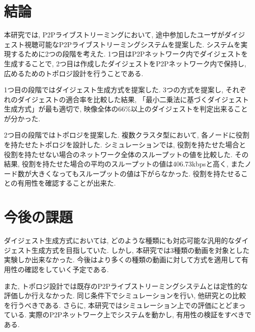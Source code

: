 \section{結論}
本研究では, P2Pライブストリーミングにおいて, 途中参加したユーザがダイジェスト視聴可能なP2Pライブストリーミングシステムを提案した. システムを実現するために2つの段階を考えた. 1つ目はP2Pネットワーク内でダイジェストを生成することで, 2つ目は作成したダイジェストをP2Pネットワーク内で保持し, 広めるためのトポロジ設計を行うことである.

1つ目の段階ではダイジェスト生成方式を提案した. 3つの方式を提案し, それぞれのダイジェストの適合率を比較した結果, 「最小二乗法に基づくダイジェスト生成方式」が最も適切で, 映像全体の66\%以上のダイジェストを判定出来ることが分かった.

2つ目の段階ではトポロジを提案した. 複数クラスタ型において, 各ノードに役割を持たせたトポロジを設計した. シミュレーションでは, 役割を持たせた場合と役割を持たせない場合のネットワーク全体のスループットの値を比較した. その結果, 役割を持たせた場合の平均のスループットの値は406.73kbpsと高く, またノード数が大きくなってもスループットの値は下がらなかった. 役割を持たせることの有用性を確認することが出来た.

\section{今後の課題}
ダイジェスト生成方式においては, どのような種類にも対応可能な汎用的なダイジェスト生成方式を目指していた. しかし, 本研究では3種類の動画を対象とした実験しか出来なかった. 今後はより多くの種類の動画に対して方式を適用して有用性の確認をしていく予定である.

また, トポロジ設計では既存のP2Pライブストリーミングシステムとは定性的な評価しか行えなかった. 同じ条件下でシミュレーションを行い, 他研究との比較を行うべきである. さらに, 本研究ではシミュレーション上での評価にとどまっている. 実際のP2Pネットワーク上でシステムを動かし, 有用性の検証をすべきである.


